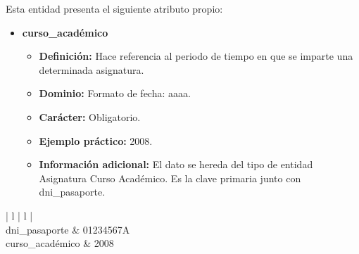\begin{description}
   \item[Descripción de los atributos propios] Esta entidad presenta el
   siguiente atributo propio:

   \begin{itemize}
   \item \textbf{curso\_académico}
      \begin{itemize}
         \item \textbf{Definición:} Hace referencia al periodo de tiempo en que se imparte una determinada asignatura.
         \item \textbf{Dominio:} Formato de fecha: aaaa.
         \item \textbf{Carácter:}  Obligatorio.
         \item \textbf{Ejemplo práctico:} 2008.
         \item \textbf{Información adicional:} El dato se hereda del tipo de entidad Asignatura Curso Académico. Es la clave primaria junto con dni\_pasaporte.
      \end{itemize}
   \end{itemize}

   \item[Ejemplo práctico]

   \item \begin{center}
            \begin{tabular}{ | l | l | }
            \hline
             \\
            \hline
            dni\_pasaporte & 01234567A \\
            \hline
            curso\_académico & 2008\\
            \hline
            \end{tabular}
         \end{center}
   \end{description}
